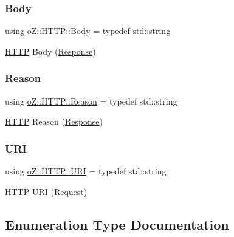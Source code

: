\subsubsection{\texorpdfstring{Body}{Body}}
{\footnotesize\ttfamily using \mbox{\hyperlink{namespaceo_z_1_1_h_t_t_p_a270c38b9f9b6228ce430fda6d5b150d6}{o\+Z\+::\+H\+T\+T\+P\+::\+Body}} = typedef std\+::string}



\mbox{\hyperlink{namespaceo_z_1_1_h_t_t_p}{H\+T\+TP}} Body (\mbox{\hyperlink{classo_z_1_1_h_t_t_p_1_1_response}{Response}}) 

\mbox{\label{namespaceo_z_1_1_h_t_t_p_afcd8b91e5e8a7b6df0a7b3b298ec3965}} 
\subsubsection{\texorpdfstring{Reason}{Reason}}
{\footnotesize\ttfamily using \mbox{\hyperlink{namespaceo_z_1_1_h_t_t_p_afcd8b91e5e8a7b6df0a7b3b298ec3965}{o\+Z\+::\+H\+T\+T\+P\+::\+Reason}} = typedef std\+::string}



\mbox{\hyperlink{namespaceo_z_1_1_h_t_t_p}{H\+T\+TP}} Reason (\mbox{\hyperlink{classo_z_1_1_h_t_t_p_1_1_response}{Response}}) 

\mbox{\label{namespaceo_z_1_1_h_t_t_p_a6d47156e2eac27750983fc1b54bd2ff8}} 
\subsubsection{\texorpdfstring{URI}{URI}}
{\footnotesize\ttfamily using \mbox{\hyperlink{namespaceo_z_1_1_h_t_t_p_a6d47156e2eac27750983fc1b54bd2ff8}{o\+Z\+::\+H\+T\+T\+P\+::\+U\+RI}} = typedef std\+::string}



\mbox{\hyperlink{namespaceo_z_1_1_h_t_t_p}{H\+T\+TP}} U\+RI (\mbox{\hyperlink{classo_z_1_1_h_t_t_p_1_1_request}{Request}}) 



\subsection{Enumeration Type Documentation}
\mbox{\label{namespaceo_z_1_1_h_t_t_p_acd43703151305f79b1e2f42e98ee8199}} 
